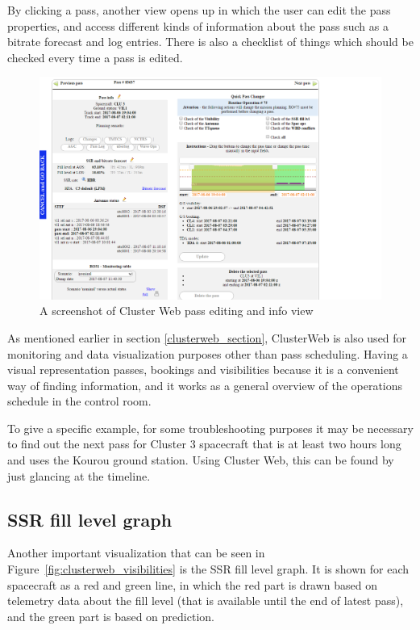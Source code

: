 By clicking a pass, another view opens up in which the user can edit the pass properties, and access different kinds of information about the pass such as a bitrate forecast and log entries. There is also a checklist of things which should be checked every time a pass is edited.

\begin{figure}[ht]
  \begin{center}
    \includegraphics*[width=1\textwidth]{clusterweb_pass_edit}
  \end{center}
  \caption{A screenshot of Cluster Web pass editing and info view}
  \label{fig:clusterweb_pass_edit}
\end{figure}

As mentioned earlier in section \ref{clusterweb_section}, ClusterWeb is also used for monitoring and data visualization purposes other than pass scheduling. Having a visual representation passes, bookings and visibilities because it is a convenient way of finding information, and it works as a general overview of the operations schedule in the control room.

To give a specific example, for some troubleshooting purposes it may be necessary to find out the next pass for Cluster 3 spacecraft that is at least two hours long and uses the Kourou ground station. Using Cluster Web, this can be found by just glancing at the timeline.

\subsection{SSR fill level graph}
Another important visualization that can be seen in Figure~\ref{fig:clusterweb_visibilities} is the SSR fill level graph. It is shown for each spacecraft as a red and green line, in which the red part is drawn based on telemetry data about the fill level (that is available until the end of latest pass), and the green part is based on prediction. 

